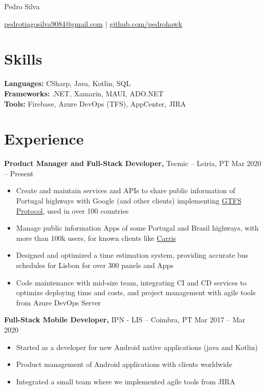\documentclass[11pt]{article}       %
\begin{document}
\centerline{\Huge Pedro Silva}

\vspace{5pt}

\centerline{\href{mailto:pedrotiagosilva9084@gmail.com}{pedrotiagosilva9084@gmail.com} | \href{https://github.com/pedrohawk}{github.com/pedrohawk}}

\vspace{-10pt}

\section*{Skills}
\textbf{Languages:} CSharp, Java, Kotlin, SQL \\
\textbf{Frameworks:} .NET, Xamarin, MAUI, ADO.NET \\
\textbf{Tools:} Firebase, Azure DevOps (TFS), AppCenter, JIRA \\

\vspace{-6.5pt}

\section*{Experience}
\textbf{Product Manager and Full-Stack Developer,} {Tecmic} -- Leiria, PT \hfill Mar 2020 -- Present \\
\vspace{-9pt}
\begin{itemize}
  \item Create and maintain services and APIs to share public information of Portugal highways with Google (and other clients) implementing \href{https://gtfs.org/getting-started/what-is-GTFS/}{GTFS Protocol}, used in over 100 countries
  \item Manage public information Apps of some Portugal and Brasil highways, with more than 100k users, for known clients like \href{https://play.google.com/store/search?q=carris&c=apps}{Carris}
  \item Designed and optimized a time estimation system, providing accurate bus schedules for Lisbon for over 300 panels and Apps
  \item Code maintenance with mid-size team, integrating CI and CD services to optimize deploying time and costs, and project management with agile tools from Azure DevOps Server
\end{itemize}

\textbf{Full-Stack Mobile Developer,} {IPN - LIS} -- Coimbra, PT \hfill Mar 2017 -- Mar 2020 \\
\vspace{-9pt}
\begin{itemize}
  \item Started as a developer for new Android native applications (java and Kotlin)
  \item Product management of Android applications with clients worldwide
  \item Integrated a small team where we implemented agile tools from JIRA
\end{itemize}
\end{document}
